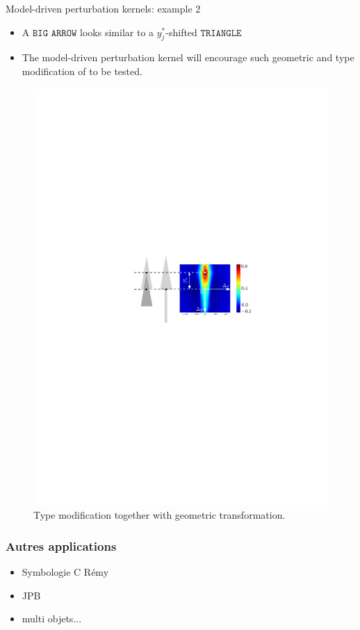 \documentclass{beamer}
\begin{document}
\begin{frame}{Model-driven perturbation kernels: example 2}
\begin{itemize}
\item A $\texttt{BIG ARROW}$  looks similar to a $y_j^*$-shifted $\texttt{TRIANGLE}$ 
 \item The model-driven perturbation kernel will encourage such geometric and type modification of to be tested.
\end{itemize}

\begin{figure}
\centering
\includegraphics[width = 0.9\linewidth]{correlation_f_t}
\caption{Type modification together with geometric transformation.}
\end{figure}
\end{frame}

\begin{frame}
\frametitle{Autres applications}
\begin{itemize}
\item Symbologie C Rémy
\item JPB
\item multi objets...
\end{itemize}
\end{frame}
\end{document}
